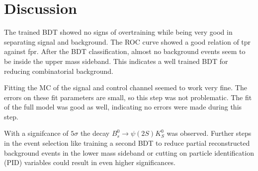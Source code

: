 \section{Discussion}
\label{sec:Diskussion}
The trained BDT showed no signs of overtraining while being very good in separating signal and background.
The ROC curve showed a good relation of tpr against fpr.
After the BDT classification, almost no background events seem to be inside the upper mass sideband.
This indicates a well trained BDT for reducing combinatorial background.


Fitting the MC of the signal and control channel seemed to work very fine.
The errors on these fit parameters are small, so this step was not problematic.
The fit of the full model was good as well, indicating no errors were made during this step.

With a signifcance of $5 \sigma$ the decay $B^0_s \rightarrow \psi(2S)K^0_S$ was observed.
Further steps in the event selection like training a second BDT to reduce partial reconstructed background events in the lower mass sideband or cutting on particle identification (PID) variables could result in even higher significances.
